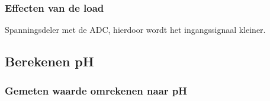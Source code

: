     \begin{frame}
        \frametitle{Effecten van de load}
    
        Spanningsdeler met de ADC, hierdoor wordt het ingangssignaal kleiner.
    
    \end{frame}

    \subsection*{Berekenen pH}
    \begin{frame}
        \frametitle{Gemeten waarde omrekenen naar pH}
        


    
    \end{frame}